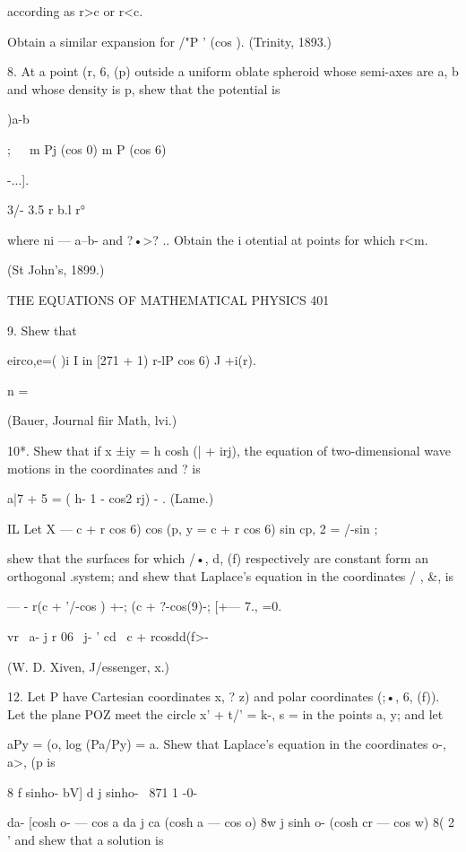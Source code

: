 according as r>c or r<c. 

Obtain a similar expansion for /"P ' (cos  ). (Trinity, 1893.) 

8. At a point (r, 6, (p) outside a uniform oblate spheroid whose semi-axes are a, b and 
whose density is p, shew that the potential is 



)a-b 



;\ \  \  m  Pj (cos 0) m  P  (cos 6) 



-...]. 



3/- 3.5 r  b.l r° 

where ni  — a--b- and ?•>? .. Obtain the i otential at points for which r<m. 

(St John's, 1899.) 



THE EQUATIONS OF MATHEMATICAL PHYSICS 401 

9. Shew that 

eirco,e=(  )i I in [271 + 1) r-lP   cos 6) J +i(r). 

n =   

(Bauer, Journal fiir Math, lvi.) 

10*. Shew that if x ±iy = h cosh (| + irj), the equation of two-dimensional wave motions 
in the coordinates   and  ? is 

a|7 + 5  =   (   h- 1 - cos2 rj) -  . (Lame.) 

IL Let X —  c + r cos 6) cos (p, y =  c + r cos 6) sin cp, 2 = /-sin ; 

shew that the surfaces for which /•, d, (f) respectively are constant form an orthogonal 
.system; and shew that Laplace's equation in the coordinates / , \&, is 

— - r(c + '/-cos )  +-;  (c + ?-cos(9)-; [+—  7., =0. 

vr \   a- j r 06 \ j- ' cd \ c + rcosdd(f>- 

(W. D. Xiven, J/essenger, x.) 

12. Let P have Cartesian coordinates  x, ?  z) and polar coordinates (;•, 6, (f)). Let 
the plane POZ meet the circle x'  + t/' = k-, s = in the points a, y; and let 

aPy = (o, log (Pa/Py) = a. 
Shew that Laplace's equation in the coordinates o-, a>, (p is 

8 f sinho- bV] d  j sinho- \  871 1  -0- 

da- [cosh o- — cos a da j ca (cosh a — cos o) 8w j sinh o- (cosh cr — cos w) 8( 2 ' 
and shew that a solution is 

